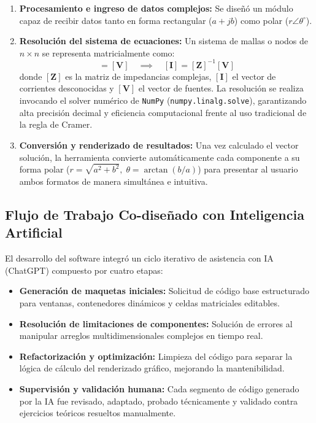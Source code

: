 \documentclass[12pt,a4paper]{article}
\begin{document}
\begin{enumerate}
    \item \textbf{Procesamiento e ingreso de datos complejos:} Se diseñó un módulo capaz de recibir datos tanto en forma rectangular ($a + jb$) como polar ($r\angle\theta^\circ$).
    
    \item \textbf{Resolución del sistema de ecuaciones:} Un sistema de mallas o nodos de $n \times n$ se representa matricialmente como:
    \begin{equation}
        [\mathbf{Z}] [\mathbf{I}] = [\mathbf{V}] \quad \implies \quad [\mathbf{I}] = [\mathbf{Z}]^{-1} [\mathbf{V}]
    \end{equation}
    donde $[\mathbf{Z}]$ es la matriz de impedancias complejas, $[\mathbf{I}]$ el vector de corrientes desconocidas y $[\mathbf{V}]$ el vector de fuentes. La resolución se realiza invocando el solver numérico de \texttt{NumPy} (\texttt{numpy.linalg.solve}), garantizando alta precisión decimal y eficiencia computacional frente al uso tradicional de la regla de Cramer.

    \item \textbf{Conversión y renderizado de resultados:} Una vez calculado el vector solución, la herramienta convierte automáticamente cada componente a su forma polar ($r = \sqrt{a^2 + b^2}, \; \theta = \arctan(b/a)$) para presentar al usuario ambos formatos de manera simultánea e intuitiva.
\end{enumerate}

\subsection{Flujo de Trabajo Co-diseñado con Inteligencia Artificial}
El desarrollo del software integró un ciclo iterativo de asistencia con IA (ChatGPT) compuesto por cuatro etapas:
\begin{itemize}
    \item \textbf{Generación de maquetas iniciales:} Solicitud de código base estructurado para ventanas, contenedores dinámicos y celdas matriciales editables.
    \item \textbf{Resolución de limitaciones de componentes:} Solución de errores al manipular arreglos multidimensionales complejos en tiempo real.
    \item \textbf{Refactorización y optimización:} Limpieza del código para separar la lógica de cálculo del renderizado gráfico, mejorando la mantenibilidad.
    \item \textbf{Supervisión y validación humana:} Cada segmento de código generado por la IA fue revisado, adaptado, probado técnicamente y validado contra ejercicios teóricos resueltos manualmente.
\end{itemize}
\end{document}
